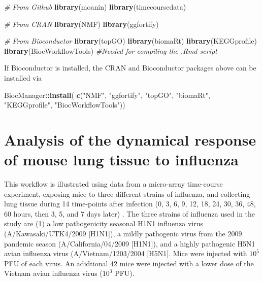 \documentclass[9pt,a4paper,]{extarticle}
\newenvironment{Shaded}{\begin{snugshade}}{\end{snugshade}}
\newcommand{\CommentTok}[1]{\textcolor[rgb]{0.56,0.35,0.01}{\textit{#1}}}
\newcommand{\KeywordTok}[1]{\textcolor[rgb]{0.13,0.29,0.53}{\textbf{#1}}}
\newcommand{\NormalTok}[1]{#1}
\newcommand{\OperatorTok}[1]{\textcolor[rgb]{0.81,0.36,0.00}{\textbf{#1}}}
\newcommand{\StringTok}[1]{\textcolor[rgb]{0.31,0.60,0.02}{#1}}
\begin{document}
\begin{Shaded}
\begin{Highlighting}[]
\CommentTok{# From Github}
\KeywordTok{library}\NormalTok{(moanin)}
\KeywordTok{library}\NormalTok{(timecoursedata)}

\CommentTok{# From CRAN}
\KeywordTok{library}\NormalTok{(NMF)}
\KeywordTok{library}\NormalTok{(ggfortify)}

\CommentTok{# From Bioconductor}
\KeywordTok{library}\NormalTok{(topGO)}
\KeywordTok{library}\NormalTok{(biomaRt)}
\KeywordTok{library}\NormalTok{(KEGGprofile)}
\KeywordTok{library}\NormalTok{(BiocWorkflowTools) }\CommentTok{#Needed for compiling the .Rmd script}
\end{Highlighting}
\end{Shaded}

If Bioconductor is installed, the CRAN and Bioconductor packages above can be installed via

\begin{Shaded}
\begin{Highlighting}[]
\NormalTok{BiocManager}\OperatorTok{::}\KeywordTok{install}\NormalTok{(}
    \KeywordTok{c}\NormalTok{(}\StringTok{"NMF"}\NormalTok{, }\StringTok{"ggfortify"}\NormalTok{, }\StringTok{"topGO"}\NormalTok{, }\StringTok{"biomaRt"}\NormalTok{,}
      \StringTok{"KEGGprofile"}\NormalTok{, }\StringTok{"BiocWorkflowTools"}\NormalTok{))}
\end{Highlighting}
\end{Shaded}

\hypertarget{analysis-of-the-dynamical-response-of-mouse-lung-tissue-to-influenza}{%
\section{Analysis of the dynamical response of mouse lung tissue to influenza}\label{analysis-of-the-dynamical-response-of-mouse-lung-tissue-to-influenza}}

This workflow is illustrated using data from a micro-array time-course
experiment, exposing mice to three different strains of influenza, and
collecting lung tissue during 14 time-points after infection (0, 3, 6, 9, 12,
18, 24, 30, 36, 48, 60 hours, then 3, 5, and 7 days later)
\citep{shoemaker:ultrasensitive}. The three strains of influenza used in the
study are (1) a low pathogenicity seasonal H1N1 influenza virus
(A/Kawasaki/UTK4/2009 {[}H1N1{]}), a mildly pathogenic virus from the 2009
pandemic season (A/California/04/2009 {[}H1N1{]}), and a highly pathogenic H5N1
avian influenza virus (A/Vietnam/1203/2004 {[}H5N1{]}. Mice were injected with
\(10^5\) PFU of each virus. An adidtional 42 mice were injected with a lower dose
of the Vietnam avian influenza virus (\(10^3\) PFU).
\end{document}
